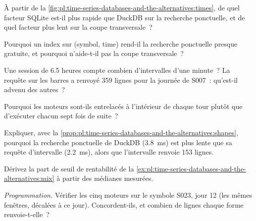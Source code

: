 \begin{exercise}[$\star$]\label{exo:pl:time-series-databases-and-the-alternatives:1}
À partir de la \cref{fig:pl:time-series-databases-and-the-alternatives:times}, de quel facteur SQLite est-il plus rapide que DuckDB sur la recherche
ponctuelle, et de quel facteur plus lent sur la coupe transversale~?
\end{exercise}

\begin{exercise}[$\star$]\label{exo:pl:time-series-databases-and-the-alternatives:2}
Pourquoi un index sur (symbol, time) rend-il la recherche ponctuelle presque gratuite, et pourquoi n'aide-t-il pas la coupe transversale~?
\end{exercise}

\begin{exercise}[$\star$]\label{exo:pl:time-series-databases-and-the-alternatives:3}
Une session de 6.5 heures compte combien d'intervalles d'une minute~? La requête sur les barres a renvoyé 359 lignes pour la journée de S007~: qu'est-il advenu
des autres~?
\end{exercise}

\begin{exercise}[$\star\star$]\label{exo:pl:time-series-databases-and-the-alternatives:4}
Pourquoi les moteurs sont-ils entrelacés à l'intérieur de chaque tour plutôt que d'exécuter chacun sept fois de suite~?
\end{exercise}

\begin{exercise}[$\star\star$]\label{exo:pl:time-series-databases-and-the-alternatives:5}
Expliquer, avec la \cref{prop:pl:time-series-databases-and-the-alternatives:shapes}, pourquoi la recherche ponctuelle de DuckDB (3.8~ms) est plus lente que
sa requête d'intervalle (2.2~ms), alors que l'intervalle renvoie 153 lignes.
\end{exercise}

\begin{exercise}[$\star\star$]\label{exo:pl:time-series-databases-and-the-alternatives:6}
Dérivez la part de seuil de rentabilité de la \cref{ex:pl:time-series-databases-and-the-alternatives:mix} à partir des
médianes mesurées.
\end{exercise}

\begin{exercise}[$\star\star\star$]\label{exo:pl:time-series-databases-and-the-alternatives:7}
\emph{Programmation.} Vérifier les cinq moteurs sur le symbole S023, jour 12 (les mêmes fenêtres, décalées à ce jour). Concordent-ils, et combien
de lignes chaque forme renvoie-t-elle~?
\end{exercise}

